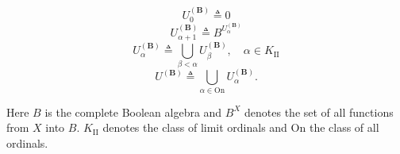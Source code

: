 $$U_0^{(\mathbf{B})} \triangleq 0$$
$$U_{\alpha+1}^{(\mathbf{B})} \triangleq B^{U_{\alpha}^{(\mathbf{B})}}$$
$$U_{\alpha}^{(\mathbf{B})} \triangleq \bigcup_{\beta < \alpha} U_{\beta}^{(\mathbf{B})}, \quad \alpha \in K_{\mathrm{II}}$$
$$U^{(\mathbf{B})} \triangleq \bigcup_{\alpha \in \mathrm{On}} U_{\alpha}^{(\mathbf{B})}.$$

Here $B$ is the complete Boolean algebra and $B^{X}$ denotes the set of all functions from $X$ into $B$. $K_{\mathrm{II}}$ denotes the class of limit ordinals and $\mathrm{On}$ the class of all ordinals.
